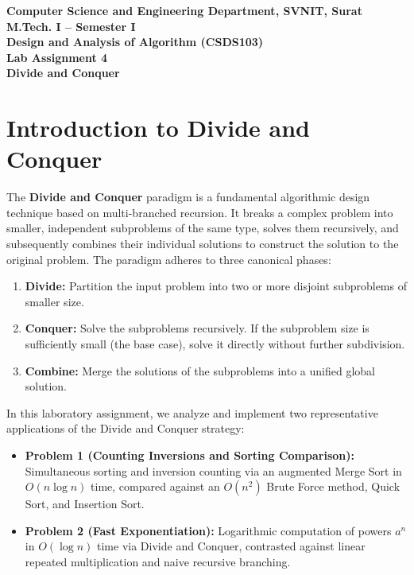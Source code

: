 \documentclass[12pt]{article}
\begin{document}

\begin{center}
\textbf{Computer Science and Engineering Department, SVNIT, Surat}\\
\textbf{M.Tech. I -- Semester I}\\
\textbf{Design and Analysis of Algorithm (CSDS103)}\\
\textbf{Lab Assignment 4}\\
\textbf{Divide and Conquer}
\end{center}

\vspace{0.3cm}

\section{Introduction to Divide and Conquer}

The \textbf{Divide and Conquer} paradigm is a fundamental algorithmic design technique based on multi-branched recursion. It breaks a complex problem into smaller, independent subproblems of the same type, solves them recursively, and subsequently combines their individual solutions to construct the solution to the original problem. The paradigm adheres to three canonical phases:
\begin{enumerate}
    \item \textbf{Divide:} Partition the input problem into two or more disjoint subproblems of smaller size.
    \item \textbf{Conquer:} Solve the subproblems recursively. If the subproblem size is sufficiently small (the base case), solve it directly without further subdivision.
    \item \textbf{Combine:} Merge the solutions of the subproblems into a unified global solution.
\end{enumerate}

In this laboratory assignment, we analyze and implement two representative applications of the Divide and Conquer strategy:
\begin{itemize}
    \item \textbf{Problem 1 (Counting Inversions and Sorting Comparison):} Simultaneous sorting and inversion counting via an augmented Merge Sort in $O(n \log n)$ time, compared against an $O(n^2)$ Brute Force method, Quick Sort, and Insertion Sort.
    \item \textbf{Problem 2 (Fast Exponentiation):} Logarithmic computation of powers $a^n$ in $O(\log n)$ time via Divide and Conquer, contrasted against linear repeated multiplication and naive recursive branching.
\end{itemize}
\end{document}

